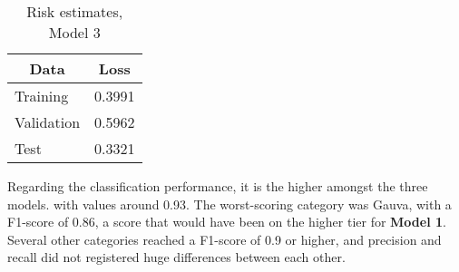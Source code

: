\documentclass[11pt]{article}
\begin{document}
\begin{table}[H]
    \begin{center}
    
    \begin{tabular}{lr}
    \multicolumn{1}{c}{\textbf{Data}} & \multicolumn{1}{c}{\textbf{Loss}} \\ \hline
        Training & 0.3991 \\
        Validation  & 0.5962 \\
        Test  & 0.3321 \\ \hline
    \end{tabular}
    \caption{Risk estimates, Model 3} \label{tab:model3_results}
    
    \end{center}
\end{table}

Regarding the classification performance, it is the higher amongst the three models. with values around 0.93. The worst-scoring category was Gauva, with a F1-score of 0.86, a score that would have been on the higher tier for \textbf{Model 1}. Several other categories reached a F1-score of 0.9 or higher, and precision and recall did not registered huge differences between each other.
\end{document}
